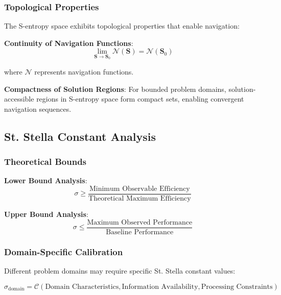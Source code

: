 \documentclass[11pt]{article}
\begin{document}
\subsubsection{Topological Properties}

The S-entropy space exhibits topological properties that enable navigation:

\textbf{Continuity of Navigation Functions}:
\begin{equation}
\lim_{\mathbf{S} \to \mathbf{S}_0} \mathcal{N}(\mathbf{S}) = \mathcal{N}(\mathbf{S}_0)
\label{eq:navigation_continuity}
\end{equation}

where $\mathcal{N}$ represents navigation functions.

\textbf{Compactness of Solution Regions}:
For bounded problem domains, solution-accessible regions in S-entropy space form compact sets, enabling convergent navigation sequences.

\subsection{St. Stella Constant Analysis}

\subsubsection{Theoretical Bounds}

\textbf{Lower Bound Analysis}:
\begin{equation}
\sigma \geq \frac{\text{Minimum Observable Efficiency}}{\text{Theoretical Maximum Efficiency}}
\label{eq:stella_lower_bound}
\end{equation}

\textbf{Upper Bound Analysis}:
\begin{equation}
\sigma \leq \frac{\text{Maximum Observed Performance}}{\text{Baseline Performance}}
\label{eq:stella_upper_bound}
\end{equation}

\subsubsection{Domain-Specific Calibration}

Different problem domains may require specific St. Stella constant values:

\begin{equation}
\sigma_{\text{domain}} = \mathcal{C}(\text{Domain Characteristics}, \text{Information Availability}, \text{Processing Constraints})
\label{eq:domain_specific_stella}
\end{equation}
\end{document}
